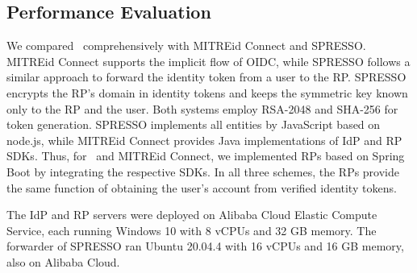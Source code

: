 \subsection{Performance Evaluation}
\label{sec:evaluation}


 We compared \usso\ comprehensively with MITREid Connect and SPRESSO.
MITREid Connect supports the implicit flow of OIDC, while SPRESSO follows a similar approach to forward the identity token from a user to the RP.
SPRESSO encrypts the RP's domain in identity tokens and keeps the symmetric key known only to the RP and the user. Both systems employ RSA-2048 and SHA-256 for token generation.
SPRESSO implements all entities by JavaScript based on node.js, while MITREid Connect provides Java implementations of IdP and RP SDKs.
Thus, for \usso\ and MITREid Connect, we implemented RPs based on Spring Boot by integrating the respective SDKs. In all three schemes, the RPs provide the same function of obtaining the user's account from verified identity tokens.

The IdP and RP servers were deployed on Alibaba Cloud Elastic Compute Service, each running Windows 10 with 8 vCPUs and 32 GB memory. The forwarder of SPRESSO ran Ubuntu 20.04.4 with 16 vCPUs and 16 GB memory, also on Alibaba Cloud.

